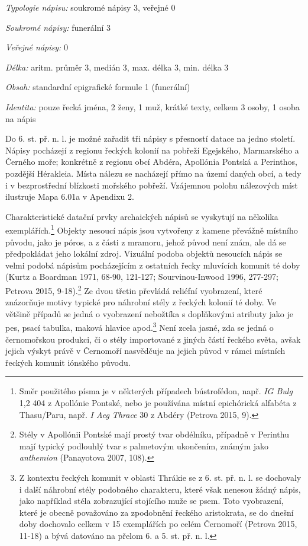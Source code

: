 {\em Typologie nápisu:} soukromé nápisy 3, veřejné 0

{\em Soukromé nápisy:} funerální 3

{\em Veřejné nápisy:} 0

{\em Délka:} aritm. průměr 3, medián 3, max. délka 3, min. délka 3

{\em Obsah:} standardní epigrafické formule 1 (funerální)

{\em Identita:} pouze řecká jména, 2 ženy, 1 muž, krátké texty, celkem 3 osoby, 1 osoba na nápis

\NC\AR
\HL
\HL
\stoptable

Do 6. st. př. n. l. je možné zařadit tři nápisy s přesností datace na jedno století. Nápisy pocházejí z regionu řeckých kolonií na pobřeží Egejského, Marmarského a Černého moře; konkrétně z regionu obcí Abdéra, Apollónia Pontská a Perinthos, pozdější Hérakleia. Místa nálezu se nacházejí přímo na území daných obcí, a tedy i v bezprostřední blízkosti mořského pobřeží. Vzájemnou polohu nálezových míst ilustruje Mapa 6.01a v Apendixu 2.

Charakteristické datační prvky archaických nápisů se vyskytují na několika exemplářích.\footnote{Směr použitého písma je v některých případech bústrofédon, např. {\em IG Bulg} 1,2 404 z Apollónie Pontské, nebo je používána místní epichórická alfabéta z Thasu/Paru, např. {\em I Aeg Thrace} 30 z Abdéry (Petrova 2015, 9).} Objekty nesoucí nápis jsou vytvořeny z kamene převážně místního původu, jako je póros, a z části z mramoru, jehož původ není znám, ale dá se předpokládat jeho lokální zdroj. Vizuální podoba objektů nesoucích nápis se velmi podobá nápisům pocházejícím z ostatních řecky mluvících komunit té doby (Kurtz a Boardman 1971, 68-90, 121-127; Sourvinou-Inwood 1996, 277-297; Petrova 2015, 9-18).\footnote{Stély v Apollónii Pontské mají prostý tvar obdélníku, případně v Perinthu mají typický podlouhlý tvar s palmetovým ukončením, známým jako {\em anthemion} (Panayotova 2007, 108).} Ze dvou třetin převládá reliéfní vyobrazení, které znázorňuje motivy typické pro náhrobní stély z řeckých kolonií té doby. Ve většině případů se jedná o vyobrazení nebožtíka s doplňkovými atributy jako je pes, psací tabulka, maková hlavice apod.\footnote{Z kontextu řeckých komunit v oblasti Thrákie se z 6. st. př. n. l. se dochovaly i další náhrobní stély podobného charakteru, které však nenesou žádný nápis, jako například stéla zobrazující stojícího muže se psem. Toto vyobrazení, které je obecně považováno za zpodobnění řeckého aristokrata, se do dnešní doby dochovalo celkem v 15 exemplářích po celém Černomoří (Petrova 2015, 11-18) a bývá datováno na přelom 6. a 5. st. př. n. l.} Není zcela jasné, zda se jedná o černomořskou produkci, či o stély importované z jiných částí řeckého světa, avšak jejich výskyt právě v Černomoří nasvědčuje na jejich původ v rámci místních řeckých komunit iónského původu.

